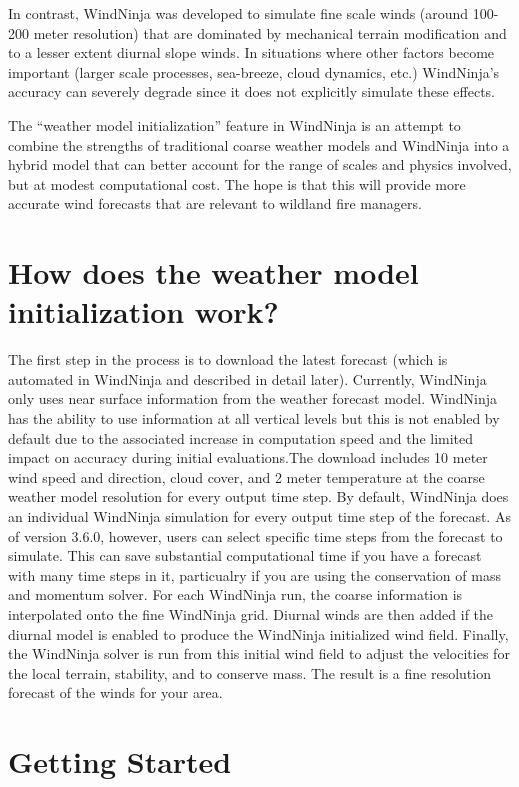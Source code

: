 \documentclass[12pt]{article}
\begin{document}
In contrast, WindNinja was developed to simulate fine scale winds (around 100-200 meter resolution) that are dominated by mechanical terrain modification and to a lesser extent diurnal slope winds.  
In situations where other factors become important (larger scale processes, sea-breeze, cloud dynamics, etc.) WindNinja's accuracy can severely degrade since it does not explicitly simulate these effects.

The “weather model initialization” feature in WindNinja is an attempt to combine the strengths of traditional coarse weather models and WindNinja into a hybrid model that can better account for the range of scales and physics involved, but at modest computational cost.  
The hope is that this will provide more accurate wind forecasts that are relevant to wildland fire managers.

\section*{How does the weather model initialization work?}

The first step in the process is to download the latest forecast (which is automated in WindNinja and described in detail later).  
Currently, WindNinja only uses near surface information from the weather forecast model. 
WindNinja has the ability to use information at all vertical levels but this is not enabled by default due to the associated increase in computation speed and the limited impact on accuracy during initial evaluations.The download includes 10 meter wind speed and direction, cloud cover, and 2 meter temperature at the coarse weather model resolution for every output time step.  
By default, WindNinja does an individual WindNinja simulation for every output time step of the forecast.  
As of version 3.6.0, however, users can select specific time steps from the forecast to simulate. 
This can save substantial computational time if you have a forecast with many time steps in it, particualry if you are using the conservation of mass and momentum solver. 
For each WindNinja run, the coarse information is interpolated onto the fine WindNinja grid.  
Diurnal winds are then added if the diurnal model is enabled to produce the WindNinja initialized wind field.  
Finally, the WindNinja solver is run from this initial wind field to adjust the velocities for the local terrain, stability, and to conserve mass.  
The result is a fine resolution forecast of the winds for your area.

\section{Getting Started}
\end{document}
